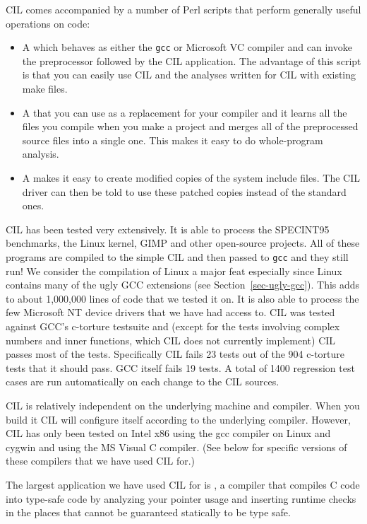 \documentclass{article}
\def\secref#1{Section~\ref{sec-#1}}
\def\t#1{{\tt #1}}
\begin{document}
 CIL comes accompanied by a number of Perl scripts that perform generally
useful operations on code:
\begin{itemize}
\item A  which behaves as either the \t{gcc} or
Microsoft VC compiler and can invoke the preprocessor followed by the CIL
application. The advantage of this script is that you can easily use CIL and
the analyses written for CIL with existing make files.
\item A  that you can use as a
replacement for your compiler and it learns all the files you compile when you
make a project and merges all of the preprocessed source files into a single
one. This makes it easy to do whole-program analysis.
\item A  makes it easy to create modified
copies of the system include files. The CIL driver can then be told to use
these patched copies instead of the standard ones.
\end{itemize}

 CIL has been tested very extensively. It is able to process the SPECINT95
benchmarks, the Linux kernel, GIMP and other open-source projects. All of
these programs are compiled to the simple CIL and then passed to \t{gcc} and
they still run! We consider the compilation of Linux a major feat especially
since Linux contains many of the ugly GCC extensions (see \secref{ugly-gcc}).
This adds to about 1,000,000 lines of code that we tested it on. It is also
able to process the few Microsoft NT device drivers that we have had access
to. CIL was tested against GCC's c-torture testsuite and (except for the tests
involving complex numbers and inner functions, which CIL does not currently
implement) CIL passes most of the tests. Specifically CIL fails 23 tests out
of the 904 c-torture tests that it should pass. GCC itself fails 19 tests. A
total of 1400 regression test cases are run automatically on each change to
the CIL sources.

 CIL is relatively independent on the underlying machine and compiler. When
you build it CIL will configure itself according to the underlying compiler.
However, CIL has only been tested on Intel x86 using the gcc compiler on Linux
and cygwin and using the MS Visual C compiler. (See below for specific
versions of these compilers that we have used CIL for.)

 The largest application we have used CIL for is
, a compiler that compiles C code into
type-safe code by analyzing your pointer usage and inserting runtime checks in
the places that cannot be guaranteed statically to be type safe.  
\end{document}
